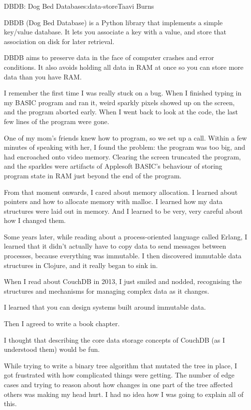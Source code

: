 \begin{aosachapter}{DBDB: Dog Bed Database}{s:data-store}{Taavi Burns}

DBDB (Dog Bed Database) is a Python library that implements a simple
key/value database. It lets you associate a key with a value, and store
that association on disk for later retrieval.

DBDB aims to preserve data in the face of computer crashes and error
conditions. It also avoids holding all data in RAM at once so you can
store more data than you have RAM.

\label{memory}

I remember the first time I was really stuck on a bug. When I finished
typing in my BASIC program and ran it, weird sparkly pixels showed up on
the screen, and the program aborted early. When I went back to look at
the code, the last few lines of the program were gone.

One of my mom's friends knew how to program, so we set up a call. Within
a few minutes of speaking with her, I found the problem: the program was
too big, and had encroached onto video memory. Clearing the screen
truncated the program, and the sparkles were artifacts of Applesoft
BASIC's behaviour of storing program state in RAM just beyond the end of
the program.

From that moment onwards, I cared about memory allocation. I learned
about pointers and how to allocate memory with malloc. I learned how my
data structures were laid out in memory. And I learned to be very, very
careful about how I changed them.

Some years later, while reading about a process-oriented language called
Erlang, I learned that it didn't actually have to copy data to send
messages between processes, because everything was immutable. I then
discovered immutable data structures in Clojure, and it really began to
sink in.

When I read about CouchDB in 2013, I just smiled and nodded, recognising
the structures and mechanisms for managing complex data as it changes.

I learned that you can design systems built around immutable data.

Then I agreed to write a book chapter.

I thought that describing the core data storage concepts of CouchDB (as
I understood them) would be fun.

While trying to write a binary tree algorithm that mutated the tree in
place, I got frustrated with how complicated things were getting. The
number of edge cases and trying to reason about how changes in one part
of the tree affected others was making my head hurt. I had no idea how I
was going to explain all of this.


\end{aosachapter}
